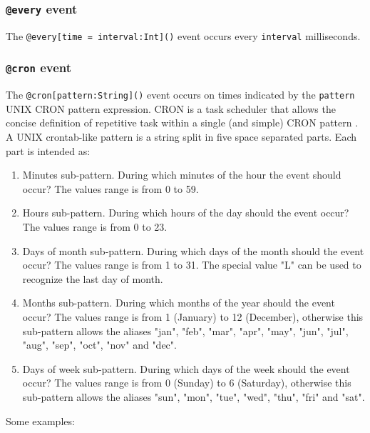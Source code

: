 \documentclass[11pt]{article}
\begin{document}
\subsubsection{\texttt{@every} event}

The \texttt{@every[time = interval:Int]()} event occurs every \texttt{interval} milliseconds.

\subsubsection{\texttt{@cron} event}

The \texttt{@cron[pattern:String]()} event occurs on times indicated by the \texttt{pattern} UNIX CRON pattern expression. CRON is a task scheduler that allows the concise definition of repetitive task within a single (and simple) CRON pattern \cite{franta1977}. A UNIX crontab-like pattern is a string split in five space separated parts. Each part is intended as:

\begin{enumerate}
\item Minutes sub-pattern. During which minutes of the hour the event should occur? The values range is from 0 to 59.
\item Hours sub-pattern. During which hours of the day should the event occur? The values range is from 0 to 23.
\item Days of month sub-pattern. During which days of the month should the event occur? The values range is from 1 to 31. The special value "L" can be used to recognize the last day of month.
\item Months sub-pattern. During which months of the year should the event occur? The values range is from 1 (January) to 12 (December), otherwise this sub-pattern allows the aliases "jan", "feb", "mar", "apr", "may", "jun", "jul", "aug", "sep", "oct", "nov" and "dec".
\item Days of week sub-pattern. During which days of the week should the event occur? The values range is from 0 (Sunday) to 6 (Saturday), otherwise this sub-pattern allows the aliases "sun", "mon", "tue", "wed", "thu", "fri" and "sat".
\end{enumerate}

Some examples:
\end{document}
